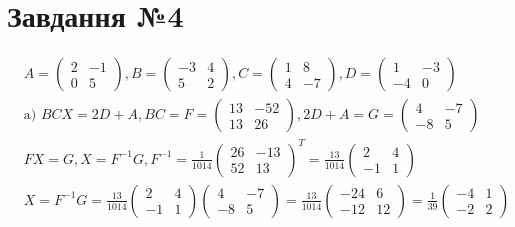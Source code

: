 \documentclass{report}
\begin{document}
\section{Завдання №4}
\begin{equation}\label{eq4}\begin{split}
	& A =\begin{pmatrix}2 & -1\\0 & 5\end{pmatrix}, B =\begin{pmatrix}-3 & 4\\5 & 2\end{pmatrix}, C =\begin{pmatrix}1 & 8\\4 & -7\end{pmatrix}, D =\begin{pmatrix}1 & -3\\-4 & 0\end{pmatrix} \\
	& \mbox{a) }BCX = 2D + A, BC = F = \begin{pmatrix}13 & -52\\13 & 26\end{pmatrix}, 2D + A = G = \begin{pmatrix}4 & -7\\-8 & 5\end{pmatrix}  \\
& FX = G, X = F^{-1}G, F^{-1} = \frac{1}{1014}\begin{pmatrix}26 & -13\\52 & 13\end{pmatrix}^{T} = \frac{13}{1014}\begin{pmatrix}2 & 4\\-1 & 1\end{pmatrix} \\
& X = F^{-1}G = \frac{13}{1014}\begin{pmatrix}2 & 4\\-1 & 1\end{pmatrix}\begin{pmatrix}4 & -7\\-8 & 5\end{pmatrix} = \frac{13}{1014}\begin{pmatrix}-24  & 6\\-12 & 12\end{pmatrix} =  \frac{1}{39}\begin{pmatrix}-4  & 1\\-2 & 2\end{pmatrix}\\

\end{split}
\end{equation}
\end{document}
